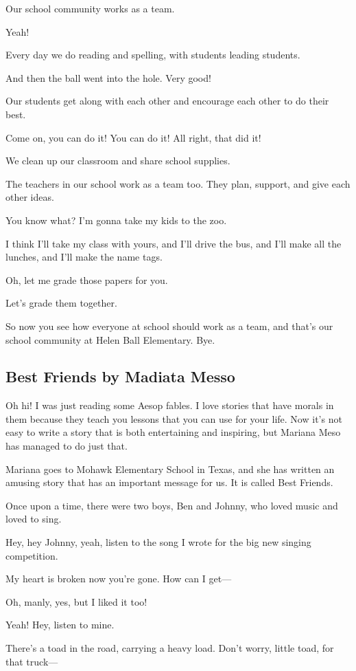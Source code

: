 Our school community works as a team.

Yeah!

Every day we do reading and spelling, with students leading students.

And then the ball went into the hole.
Very good!

Our students get along with each other and encourage each other to do their best.

Come on, you can do it!
You can do it!
All right, that did it!

We clean up our classroom and share school supplies.

The teachers in our school work as a team too.
They plan, support, and give each other ideas.

You know what?
I'm gonna take my kids to the zoo.

I think I'll take my class with yours, and I'll drive the bus, and I'll make all the lunches, and I'll make the name tags.

Oh, let me grade those papers for you.

Let's grade them together.

So now you see how everyone at school should work as a team, and that's our school community at Helen Ball Elementary.
Bye.

\subsection{Best Friends by Madiata Messo}

Oh hi!
I was just reading some Aesop fables.
I love stories that have morals in them because they teach you lessons that you can use for your life.
Now it's not easy to write a story that is both entertaining and inspiring, but Mariana Meso has managed to do just that.

Mariana goes to Mohawk Elementary School in Texas, and she has written an amusing story that has an important message for us.
It is called Best Friends.

Once upon a time, there were two boys, Ben and Johnny, who loved music and loved to sing.

Hey, hey Johnny, yeah, listen to the song I wrote for the big new singing competition.

My heart is broken now you're gone.
How can I get—

Oh, manly, yes, but I liked it too!

Yeah!
Hey, listen to mine.

There's a toad in the road, carrying a heavy load.
Don't worry, little toad, for that truck—

